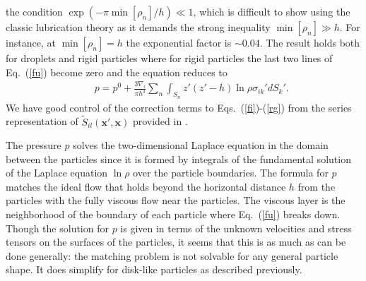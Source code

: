 the condition $\exp{(-\pi \min[\rho_n]/h)}\ll 1$, which is difficult to show
using the classic lubrication theory as it demands the strong inequality $\min[\rho_n]\gg h$. For instance, at $\min[\rho_n]=h$ the exponential factor is $\sim 0.04$. The result holds both for droplets and rigid particles where for rigid particles the last two lines of Eq.~(\ref{fu}) become zero and the equation reduces to
\begin{eqnarray}&&\!\!\!\!\!\!
p=p^0+\frac{3\nabla_i}{\pi h^3}\sum_n\int_{S_n}z'(z'-h) \ln \rho \sigma_{ik}'dS_k'.\label{rg}
\end{eqnarray}
We have good control of the correction terms to Eqs.~(\ref{fi})-(\ref{rg}) from the series representation of ${\tilde S}_{il}(\bm x', \bm x)$ provided in \cite{LironMochon}.

The pressure $p$ solves the two-dimensional Laplace equation in the domain between the particles since it is formed by integrals of the fundamental solution of the Laplace equation $\ln \rho$ over the particle boundaries.
The formula for $p$ matches the ideal flow that holds beyond the horizontal distance $h$ from the particles with the fully viscous flow near the particles. The viscous layer is the neighborhood
of the boundary of each particle where Eq.~(\ref{fu}) breaks down. Though the solution for $p$ is given in terms
of the unknown velocities and stress tensors on the surfaces of the particles, it seems that this is as much as can be done generally: the matching problem is not solvable for any general particle shape. It does simplify for disk-like particles as described previously.

